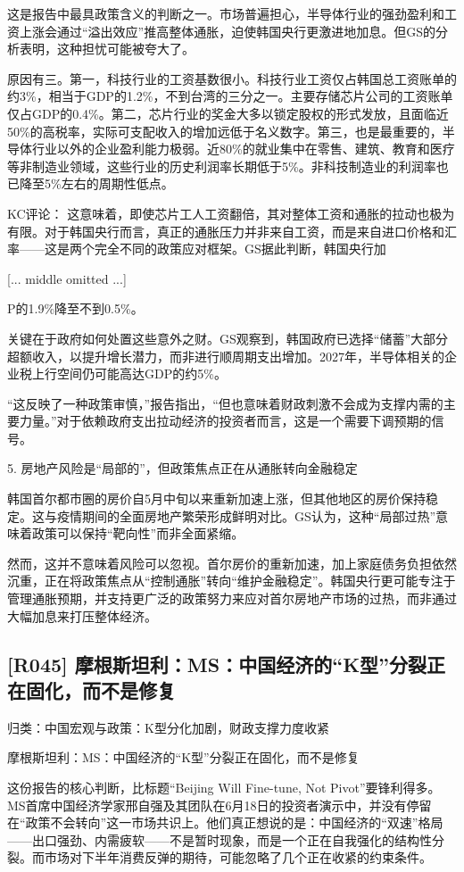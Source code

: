 \documentclass[11pt]{ctexart}
\begin{document}
这是报告中最具政策含义的判断之一。市场普遍担心，半导体行业的强劲盈利和工资上涨会通过“溢出效应”推高整体通胀，迫使韩国央行更激进地加息。但GS的分析表明，这种担忧可能被夸大了。

原因有三。第一，科技行业的工资基数很小。科技行业工资仅占韩国总工资账单的约3\%，相当于GDP的1.2\%，不到台湾的三分之一。主要存储芯片公司的工资账单仅占GDP的0.4\%。第二，芯片行业的奖金大多以锁定股权的形式发放，且面临近50\%的高税率，实际可支配收入的增加远低于名义数字。第三，也是最重要的，半导体行业以外的企业盈利能力极弱。近80\%的就业集中在零售、建筑、教育和医疗等非制造业领域，这些行业的历史利润率长期低于5\%。非科技制造业的利润率也已降至5\%左右的周期性低点。

KC评论： 这意味着，即使芯片工人工资翻倍，其对整体工资和通胀的拉动也极为有限。对于韩国央行而言，真正的通胀压力并非来自工资，而是来自进口价格和汇率——这是两个完全不同的政策应对框架。GS据此判断，韩国央行加

[... middle omitted ...]

P的1.9\%降至不到0.5\%。

关键在于政府如何处置这些意外之财。GS观察到，韩国政府已选择“储蓄”大部分超额收入，以提升增长潜力，而非进行顺周期支出增加。2027年，半导体相关的企业税上行空间仍可能高达GDP的约5\%。

“这反映了一种政策审慎，”报告指出，“但也意味着财政刺激不会成为支撑内需的主要力量。”对于依赖政府支出拉动经济的投资者而言，这是一个需要下调预期的信号。

5. 房地产风险是“局部的”，但政策焦点正在从通胀转向金融稳定

韩国首尔都市圈的房价自5月中旬以来重新加速上涨，但其他地区的房价保持稳定。这与疫情期间的全面房地产繁荣形成鲜明对比。GS认为，这种“局部过热”意味着政策可以保持“靶向性”而非全面紧缩。

然而，这并不意味着风险可以忽视。首尔房价的重新加速，加上家庭债务负担依然沉重，正在将政策焦点从“控制通胀”转向“维护金融稳定”。韩国央行更可能专注于管理通胀预期，并支持更广泛的政策努力来应对首尔房地产市场的过热，而非通过大幅加息来打压整体经济。

\subsection{[R045] 摩根斯坦利：MS：中国经济的“K型”分裂正在固化，而不是修复}
{\small\color{refgray}归类：中国宏观与政策：K型分化加剧，财政支撑力度收紧}

摩根斯坦利：MS：中国经济的“K型”分裂正在固化，而不是修复

这份报告的核心判断，比标题“Beijing Will Fine-tune, Not Pivot”要锋利得多。MS首席中国经济学家邢自强及其团队在6月18日的投资者演示中，并没有停留在“政策不会转向”这一市场共识上。他们真正想说的是：中国经济的“双速”格局——出口强劲、内需疲软——不是暂时现象，而是一个正在自我强化的结构性分裂。而市场对下半年消费反弹的期待，可能忽略了几个正在收紧的约束条件。
\end{document}

